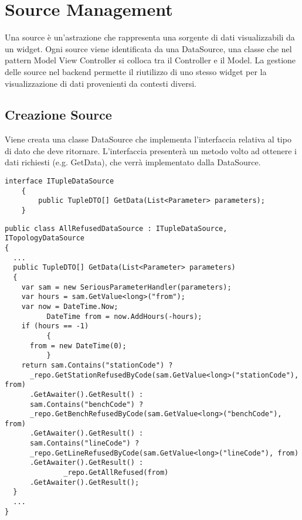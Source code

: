 \section{Source Management}
\label{ch:sms}
Una source è un'astrazione che rappresenta una sorgente di dati visualizzabili da un widget. Ogni source viene identificata da una DataSource, una classe che nel pattern Model View Controller si colloca tra il Controller e il Model. La gestione delle source nel backend permette il riutilizzo di uno stesso widget per la visualizzazione di dati provenienti da contesti diversi.

\subsection{Creazione Source}
\label{sec:datasource}
Viene creata una classe DataSource che implementa l’interfaccia relativa al tipo di dato che deve ritornare. L'interfaccia presenterà un metodo volto ad ottenere i dati richiesti (e.g. GetData), che verrà implementato dalla DataSource.
\begin{lstlisting}[caption={ITupleDataSource.cs}, style=sharpCode]
interface ITupleDataSource
    {
        public TupleDTO[] GetData(List<Parameter> parameters);
    }
\end{lstlisting}
\begin{lstlisting}[caption={TupleDataSource.cs}, style=sharpCode]
public class AllRefusedDataSource : ITupleDataSource, ITopologyDataSource
{
  ...
  public TupleDTO[] GetData(List<Parameter> parameters)
  {
    var sam = new SeriousParameterHandler(parameters);
    var hours = sam.GetValue<long>("from");
    var now = DateTime.Now;
          DateTime from = now.AddHours(-hours);
    if (hours == -1)
          {
      from = new DateTime(0);
          }
    return sam.Contains("stationCode") ? 
      _repo.GetStationRefusedByCode(sam.GetValue<long>("stationCode"), from)
      .GetAwaiter().GetResult() :
      sam.Contains("benchCode") ? 
      _repo.GetBenchRefusedByCode(sam.GetValue<long>("benchCode"), from)
      .GetAwaiter().GetResult() :
      sam.Contains("lineCode") ?
      _repo.GetLineRefusedByCode(sam.GetValue<long>("lineCode"), from)
      .GetAwaiter().GetResult() :
              _repo.GetAllRefused(from)
      .GetAwaiter().GetResult();
  }
  ...
}
\end{lstlisting}

